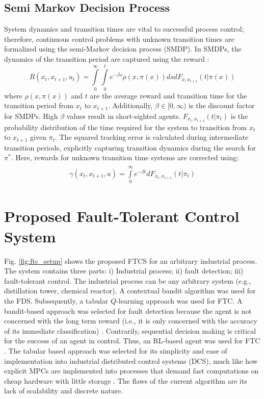 \subsection{Semi Markov Decision Process}
System dynamics and transition times are vital to successful process control; therefore, continuous control problems with unknown transition times are formalized using the semi-Markov decision process (SMDP). In SMDPs, the dynamics of the transition period are captured using the reward \cite{continuous_rl_ref14}:
\begin{equation}
R(x_t, x_{t+1}, u_t) = \int\limits^\infty_0 \int\limits^t_0 e^{-\beta s} \rho(x, \pi (x))dsdF_{x, x_{t+1}}(t | \pi (x))
\label{eq:reward_rate}
\end{equation}
where $\rho(x, \pi (x))$ and $t$ are the average reward and transition time for the transition period from $x_t$ to $x_{t+1}$. Additionally, $\beta \in [0, \infty)$ is the discount factor for SMDPs.  High $\beta$ values result in short-sighted agents. $F_{x_t, x_{t+1}}(t | \pi_t)$ is the probability distribution of the time required for the system to transition from $x_t$ to $x_{t+1}$ given $\pi_t$.  The squared tracking error is calculated during intermediate transition periods, explicitly capturing transition dynamics during the search for $\pi^*$. Here, rewards for unknown transition time systems are corrected using:
\begin{eqnarray}
\begin{array}{rcl}
\gamma(x_t, x_{t+1}, u) = \int\limits^{\infty}_0 e^{-\beta t} dF_{x_t, x_{t+1}}(t | \pi_t)
\end{array}
\label{eq:discount_factor}
\end{eqnarray}

\section{Proposed Fault-Tolerant Control System}

Fig. \ref{fig:ftc_setup} shows the proposed FTCS for an arbitrary industrial process. The system contains three parts: i) Industrial process; ii) fault detection; iii) fault-tolerant control. The industrial process can be any arbitrary system (e.g., distillation tower, chemical reactor). A contextual bandit algorithm was used for the FDS. Subsequently, a tabular $Q$-learning approach was used for FTC. A bandit-based approach was selected for fault detection because the agent is not concerned with the long term reward (i.e., it is only concerned with the accuracy of its immediate classification) \cite{sutton}.  Contrarily, sequential decision making is critical for the success of an agent in control.  Thus, an RL-based agent was used for FTC \cite{bandits_ref9}. The tabular based approach was selected for its simplicity and ease of implementation into industrial distributed control systems (DCS), much like how explicit MPCs are implemented into processes that demand fast computations on cheap hardware with little storage \cite{explicit_MPC}. The flaws of the current algorithm are its lack of scalability and discrete nature.

